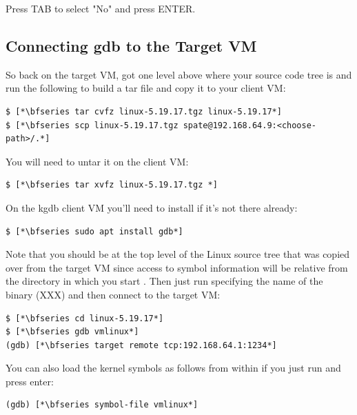 \noindent
Press TAB to select "No" and press ENTER.


\subsection{Connecting gdb to the Target VM}

So back on the target VM, got one level above where your source code tree is and run the following to build a tar file and copy it to your  client VM:

\begin{lstlisting}
$ [*\bfseries tar cvfz linux-5.19.17.tgz linux-5.19.17*]
$ [*\bfseries scp linux-5.19.17.tgz spate@192.168.64.9:<choose-path>/.*]
\end{lstlisting}

\noindent
You will need to untar it on the client VM:

\begin{lstlisting}
$ [*\bfseries tar xvfz linux-5.19.17.tgz *]
\end{lstlisting}

On the kgdb client VM you'll need to install  if it's not there already:

\begin{lstlisting}
$ [*\bfseries sudo apt install gdb*]
\end{lstlisting}

\noindent
Note that you should be at the top level of the Linux source tree that was copied over from the target VM since access to symbol information will be relative from the directory in which you start . Then just run  specifying the name of the binary (XXX) and then connect to the target VM:

\begin{lstlisting}
$ [*\bfseries cd linux-5.19.17*]
$ [*\bfseries gdb vmlinux*]
(gdb) [*\bfseries target remote tcp:192.168.64.1:1234*]
\end{lstlisting}

\noindent
You can also load the kernel symbols as follows from within  if you just run  and press enter:

\begin{lstlisting}
(gdb) [*\bfseries symbol-file vmlinux*]
\end{lstlisting}


